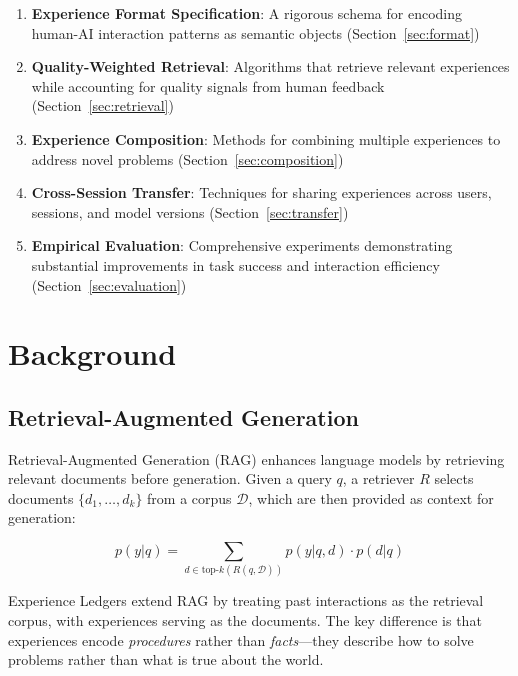 \documentclass[11pt,letterpaper]{article}
\begin{document}
\begin{enumerate}
    \item \textbf{Experience Format Specification}: A rigorous schema for encoding human-AI interaction patterns as semantic objects (Section~\ref{sec:format})

    \item \textbf{Quality-Weighted Retrieval}: Algorithms that retrieve relevant experiences while accounting for quality signals from human feedback (Section~\ref{sec:retrieval})

    \item \textbf{Experience Composition}: Methods for combining multiple experiences to address novel problems (Section~\ref{sec:composition})

    \item \textbf{Cross-Session Transfer}: Techniques for sharing experiences across users, sessions, and model versions (Section~\ref{sec:transfer})

    \item \textbf{Empirical Evaluation}: Comprehensive experiments demonstrating substantial improvements in task success and interaction efficiency (Section~\ref{sec:evaluation})
\end{enumerate}

\section{Background}

\subsection{Retrieval-Augmented Generation}

Retrieval-Augmented Generation (RAG) enhances language models by retrieving relevant documents before generation. Given a query $q$, a retriever $R$ selects documents $\{d_1, \ldots, d_k\}$ from a corpus $\mathcal{D}$, which are then provided as context for generation:

\begin{equation}
p(y|q) = \sum_{d \in \text{top-}k(R(q, \mathcal{D}))} p(y|q, d) \cdot p(d|q)
\end{equation}

Experience Ledgers extend RAG by treating past interactions as the retrieval corpus, with experiences serving as the documents. The key difference is that experiences encode \emph{procedures} rather than \emph{facts}---they describe how to solve problems rather than what is true about the world.
\end{document}
